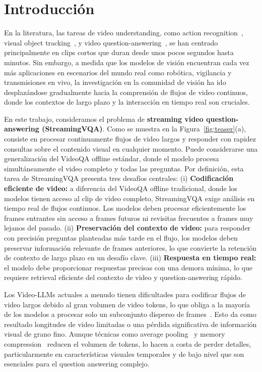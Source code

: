 \section{Introducción}
\label{sec:introduction}

En la literatura, las tareas de video understanding, 
como action recognition~\citep{activitynet,something,kinetics}, 
visual object tracking~\citep{got_10k,trackingnet}, 
y video question-answering~\citep{msrvtt_qa,jang2017tgifqa,next_qa,li2024mvbench}, 
se han centrado principalmente en clips cortos que duran desde unos pocos segundos hasta minutos. 
Sin embargo, a medida que los modelos de visión encuentran cada vez más aplicaciones en escenarios del mundo real como robótica, vigilancia y transmisiones en vivo, la investigación en la comunidad de visión ha ido desplazándose gradualmente hacia la comprensión de flujos de video continuos, donde los contextos de largo plazo y la interacción en tiempo real son cruciales.

En este trabajo, consideramos el problema de \textbf{streaming video question-answering (StreamingVQA)}. Como se muestra en la Figura~\ref{fig:teaser}(a),
consiste en procesar continuamente flujos de video largos y responder con rapidez consultas sobre el contenido visual en cualquier momento. Puede considerarse una generalización del VideoQA offline estándar, donde el modelo procesa simultáneamente el video completo y todas las preguntas. Por definición, esta tarea de StreamingVQA presenta tres desafíos centrales: 
(i) \textbf{Codificación eficiente de video:}
a diferencia del VideoQA offline tradicional, donde los modelos tienen acceso al clip de video completo, StreamingVQA exige análisis en tiempo real de flujos continuos. Los modelos deben procesar eficientemente los frames entrantes sin acceso a frames futuros ni revisitas frecuentes a frames muy lejanos del pasado. (ii) \textbf{Preservación del contexto de video:} 
para responder con precisión preguntas planteadas más tarde en el flujo, los modelos deben preservar información relevante de frames anteriores, lo que convierte la retención de contexto de largo plazo en un desafío clave. 
(iii) \textbf{Respuesta en tiempo real:} 
el modelo debe proporcionar respuestas precisas con una demora mínima, lo que requiere retrieval eficiente del contexto de video y question-answering rápido.

Los Video-LLMs actuales a menudo tienen dificultades para codificar flujos de video largos debido al gran volumen de video tokens, lo que obliga a la mayoría de los modelos a procesar solo un subconjunto disperso de frames~\citep{video_chatgpt, llava_next_video, llava_onevision}. 
Esto da como resultado longitudes de video limitadas o una pérdida significativa de información visual de grano fino. Aunque técnicas como average pooling~\citep{llamavid} y memory compression~\citep{wu2022memvit,wang2023memory,he2024ma,flashvstream,videostreaming} reducen el volumen de tokens, lo hacen a costa de perder detalles, particularmente en características visuales temporales y de bajo nivel que son esenciales para el question answering complejo.


